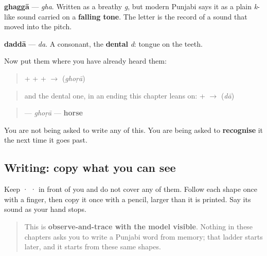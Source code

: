 \begin{quote}
\end{quote}

\textbf{ghaggā} — \emph{gha}. Written as a breathy \emph{g}, but modern Punjabi says it as a plain \emph{k}-like sound carried on a \textbf{falling tone}. The letter is the record of a sound that moved into the pitch.

\begin{quote}
\end{quote}

\textbf{daddā} — \emph{da}. A consonant, the \textbf{dental} \emph{d}: tongue on the teeth.

Now put them where you have already heard them:

\begin{quote}
\textbf{} + \textbf{} + \textbf{} + \textbf{} $\to$ \textbf{} (\emph{ghoṛā})
\end{quote}

\begin{quote}
and the dental one, in an ending this chapter leans on: \textbf{} + \textbf{} $\to$ \textbf{} (\emph{dā})
\end{quote}

\begin{quote}
\textbf{} — \emph{ghoṛā} — \textbf{horse}
\end{quote}

You are not being asked to write any of this. You are being asked to \textbf{recognise} it the next time it goes past.

\subsection*{Writing: copy what you can see}

Keep  ·  ·  in front of you and do not cover any of them. Follow each shape once with a finger, then copy it once with a pencil, larger than it is printed. Say its sound as your hand stops.

\begin{quote}
This is \textbf{observe-and-trace with the model visible}. Nothing in these chapters asks you to write a Punjabi word from memory; that ladder starts later, and it starts from these same shapes.
\end{quote}

